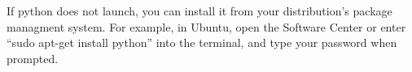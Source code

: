 If python does not launch, you can install it from your distribution's package managment system.
For example, in Ubuntu, open the Software Center or enter ``sudo apt-get install python'' into the terminal, and type your password when prompted.
